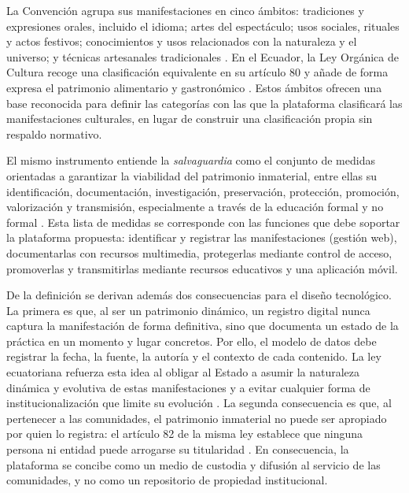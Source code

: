 La Convención agrupa sus manifestaciones en cinco ámbitos: tradiciones y expresiones orales, incluido el idioma; artes del espectáculo; usos sociales, rituales y actos festivos; conocimientos y usos relacionados con la naturaleza y el universo; y técnicas artesanales tradicionales \cite{unesco2003convencion}. En el Ecuador, la Ley Orgánica de Cultura recoge una clasificación equivalente en su artículo 80 y añade de forma expresa el patrimonio alimentario y gastronómico \cite{ecuador2016cultura}. Estos ámbitos ofrecen una base reconocida para definir las categorías con las que la plataforma clasificará las manifestaciones culturales, en lugar de construir una clasificación propia sin respaldo normativo.

El mismo instrumento entiende la \textit{salvaguardia} como el conjunto de medidas orientadas a garantizar la viabilidad del patrimonio inmaterial, entre ellas su identificación, documentación, investigación, preservación, protección, promoción, valorización y transmisión, especialmente a través de la educación formal y no formal \cite{unesco2003convencion}. Esta lista de medidas se corresponde con las funciones que debe soportar la plataforma propuesta: identificar y registrar las manifestaciones (gestión web), documentarlas con recursos multimedia, protegerlas mediante control de acceso, promoverlas y transmitirlas mediante recursos educativos y una aplicación móvil.

De la definición se derivan además dos consecuencias para el diseño tecnológico. La primera es que, al ser un patrimonio dinámico, un registro digital nunca captura la manifestación de forma definitiva, sino que documenta un estado de la práctica en un momento y lugar concretos. Por ello, el modelo de datos debe registrar la fecha, la fuente, la autoría y el contexto de cada contenido. La ley ecuatoriana refuerza esta idea al obligar al Estado a asumir la naturaleza dinámica y evolutiva de estas manifestaciones y a evitar cualquier forma de institucionalización que limite su evolución \cite{ecuador2016cultura}. La segunda consecuencia es que, al pertenecer a las comunidades, el patrimonio inmaterial no puede ser apropiado por quien lo registra: el artículo 82 de la misma ley establece que ninguna persona ni entidad puede arrogarse su titularidad \cite{ecuador2016cultura}. En consecuencia, la plataforma se concibe como un medio de custodia y difusión al servicio de las comunidades, y no como un repositorio de propiedad institucional.

